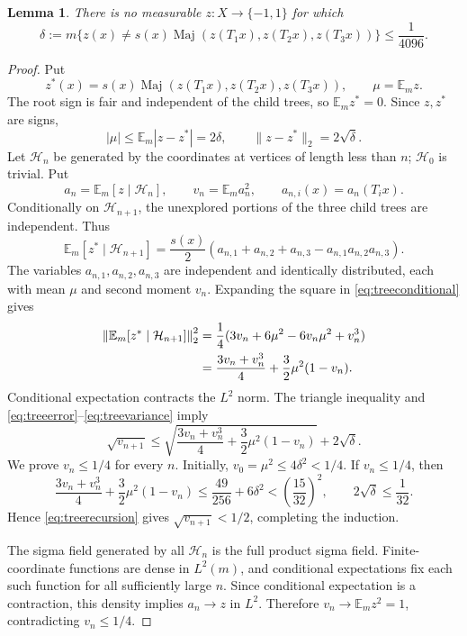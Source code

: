 \documentclass[11pt]{article}
\newtheorem{lemma}[theorem]{Lemma}
\theoremstyle{remark}
\newcommand{\E}{\mathbb E}
\newcommand{\Hh}{\mathcal H}
\newcommand{\Maj}{\operatorname{Maj}}
\begin{document}
\begin{lemma}\label{lem:tree}
There is no measurable $z:X\to\{-1,1\}$ for which
\[
 \delta:=m\{z(x)\ne s(x)\Maj(z(T_1x),z(T_2x),z(T_3x))\}
 \le\frac1{4096}.
\]
\end{lemma}
\begin{proof}
Put
\[
 z^*(x)=s(x)\Maj(z(T_1x),z(T_2x),z(T_3x)),\qquad
 \mu=\E_m z.
\]
The root sign is fair and independent of the child trees, so
$\E_m z^*=0$. Since $z,z^*$ are signs,
\begin{equation}\label{eq:treeerror}
 |\mu|\le\E_m|z-z^*|=2\delta,
 \qquad \|z-z^*\|_2=2\sqrt\delta.
\end{equation}
Let $\Hh_n$ be generated by the coordinates at vertices of length less
than $n$; $\Hh_0$ is trivial. Put
\[
 a_n=\E_m[z\mid\Hh_n],\qquad v_n=\E_m a_n^2,
 \qquad a_{n,i}(x)=a_n(T_i x).
\]
Conditionally on $\Hh_{n+1}$, the unexplored portions of the three
child trees are independent. Thus
\begin{equation}\label{eq:treeconditional}
 \E_m[z^*\mid\Hh_{n+1}]
 =\frac{s(x)}2
  (a_{n,1}+a_{n,2}+a_{n,3}-a_{n,1}a_{n,2}a_{n,3}).
\end{equation}
The variables $a_{n,1},a_{n,2},a_{n,3}$ are independent and identically
distributed, each with mean $\mu$ and second moment $v_n$.
Expanding the square in \eqref{eq:treeconditional} gives
\begin{align}
 \left\|\E_m[z^*\mid\Hh_{n+1}]\right\|_2^2
 &=\frac14(3v_n+6\mu^2-6v_n\mu^2+v_n^3)\notag\\
 &=\frac{3v_n+v_n^3}{4}+\frac32\mu^2(1-v_n).
 \label{eq:treevariance}
\end{align}
Conditional expectation contracts the $L^2$ norm. The triangle
inequality and \eqref{eq:treeerror}--\eqref{eq:treevariance} imply
\begin{equation}\label{eq:treerecursion}
 \sqrt{v_{n+1}}
 \le\sqrt{\frac{3v_n+v_n^3}{4}+\frac32\mu^2(1-v_n)}
       +2\sqrt\delta.
\end{equation}
We prove $v_n\le1/4$ for every $n$. Initially,
$v_0=\mu^2\le4\delta^2<1/4$. If $v_n\le1/4$, then
\[
 \frac{3v_n+v_n^3}{4}+\frac32\mu^2(1-v_n)
 \le\frac{49}{256}+6\delta^2
 <\left(\frac{15}{32}\right)^2,
 \qquad 2\sqrt\delta\le\frac1{32}.
\]
Hence \eqref{eq:treerecursion} gives
$\sqrt{v_{n+1}}<1/2$, completing the induction.

The sigma field generated by all $\Hh_n$ is the full product sigma
field. Finite-coordinate functions are dense in $L^2(m)$, and
conditional expectations fix each such function for all sufficiently
large $n$. Since conditional expectation is a contraction, this density
implies $a_n\to z$ in $L^2$. Therefore
$v_n\to\E_m z^2=1$, contradicting $v_n\le1/4$.
\end{proof}
\end{document}
